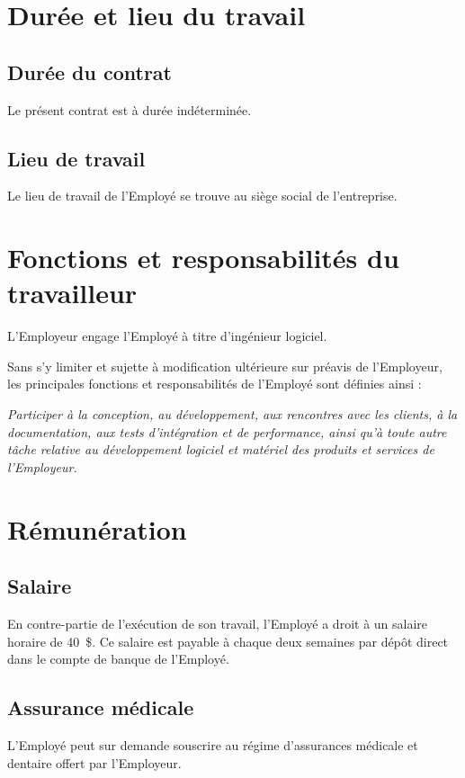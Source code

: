 \documentclass{article}
\begin{document}
    \section{Durée et lieu du travail}
    
        \subsection{Durée du contrat}
	    Le présent contrat est à durée indéterminée.
        	
    	\subsection{Lieu de travail}
    	Le lieu de travail de l'Employé se trouve au siège social de l'entreprise.
    	
   \section{Fonctions et responsabilités du travailleur}
   	L'Employeur engage l'Employé à titre d'ingénieur logiciel.

    Sans s'y limiter et sujette à modification ultérieure sur préavis de l'Employeur, les principales fonctions et responsabilités de l'Employé sont définies ainsi :
    	
    	\emph{Participer à la conception, au développement, aux rencontres avec les clients, à la documentation, aux tests d'intégration et de performance, ainsi qu'à toute autre tâche relative au développement logiciel et matériel des produits et services de l'Employeur.}
    
    \section{Rémunération}
    	\subsection{Salaire}
    	En contre-partie de l'exécution de son travail, l'Employé a droit à un salaire horaire de \SI{40}{\$}. Ce salaire est payable à chaque deux semaines par dépôt direct dans le compte de banque de l'Employé.
    	
    	\subsection{Assurance médicale}
    	L'Employé peut sur demande souscrire au régime d'assurances médicale et dentaire offert par l'Employeur.
    	
\end{document}
